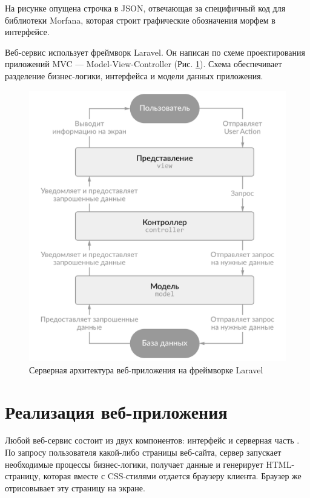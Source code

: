 \documentclass[a4paper,12pt]{article}
\begin{document}
На рисунке опущена строчка в JSON, отвечающая за специфичный код для библиотеки Morfana, которая строит графические обозначения морфем в интерфейсе.

Веб-сервис использует фреймворк Laravel. Он написан по схеме проектирования приложений MVC — Model-View-Controller (Рис. \ref{fig:mvc_architecture}). Схема обеспечивает разделение бизнес-логики, интерфейса и модели данных приложения.

\begin{figure}[ht!]
\centering
\includegraphics[scale=0.3]{mvc_architecture}
\caption{Серверная архитектура веб-приложения на фреймворке Laravel}
\label{fig:mvc_architecture}
\end{figure}

\section{Реализация веб-приложения}
Любой веб-сервис состоит из двух компонентов: интерфейс и серверная часть \cite{guide_web}. По запросу пользователя какой-либо страницы веб-сайта, сервер запускает необходимые процессы бизнес-логики, получает данные и генерирует HTML-страницу, которая вместе с CSS-стилями отдается браузеру клиента. Браузер же отрисовывает эту страницу на экране.
\end{document}
